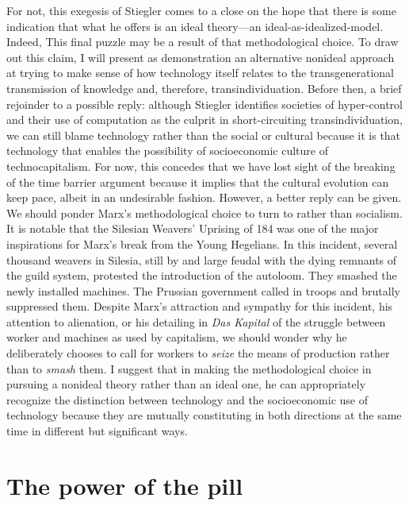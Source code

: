 \documentclass[letterpaper,notitlepage,12pt]{article}
\begin{document}
For not, this exegesis of Stiegler comes to a close on the hope that there is
some indication that what he offers is an ideal theory---an
ideal-as-idealized-model.
Indeed, This final puzzle may be a result of that methodological choice.
To draw out this claim, I will present as demonstration an alternative nonideal
approach at trying to make sense of how technology itself relates to the
transgenerational transmission of knowledge and, therefore, transindividuation.
Before then, a brief rejoinder to a possible reply: although Stiegler identifies
societies of hyper-control and their use of computation as the culprit in
short-circuiting transindividuation, we can still blame technology rather than
the social or cultural because it is that technology that enables the
possibility of socioeconomic culture of technocapitalism.
For now, this concedes that we have lost sight of the breaking of the time
barrier argument because it implies that the cultural evolution can keep pace,
albeit in an undesirable fashion.
However, a better reply can be given.
We should ponder Marx's methodological choice to turn to 
rather than  socialism.
It is notable that the Silesian Weavers' Uprising of 184 was one of the major
inspirations for Marx's break from the Young Hegelians.
In this incident, several thousand weavers in Silesia, still by and large feudal
with the dying remnants of the guild system, protested the introduction of the
autoloom.
They smashed the newly installed machines.
The Prussian government called in troops and brutally suppressed them.
Despite Marx's attraction and sympathy for this incident, his attention to
alienation, or his detailing in \textit{Das Kapital} of the struggle between
worker and machines as used by capitalism, we should wonder why he deliberately
chooses to call for workers to \textit{seize} the means of production rather
than to \textit{smash} them.
I suggest that in making the methodological choice in pursuing a nonideal theory
rather than an ideal one, he can appropriately recognize the distinction between
technology and the socioeconomic use of technology because they are mutually
constituting in both directions at the same time in different but significant
ways.

\section{The power of the pill}
\end{document}
